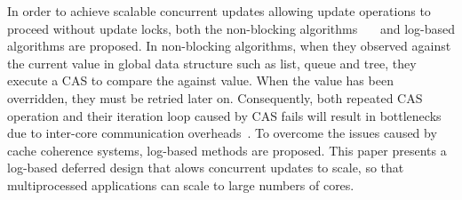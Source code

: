 In order to achieve scalable concurrent updates allowing update operations to
proceed without update locks, both the non-blocking
algorithms~\cite{Harris2001Lockfree}~\cite{Fomitchev2004Lockfree}~\cite{Timnat2012}
and log-based algorithms are proposed.
In non-blocking algorithms, when they observed against the current value in
global data structure such as list, queue and tree, they execute a CAS to
compare the against value.
When the value has been overridden, they must be retried later on.
Consequently, both repeated CAS operation and their iteration loop caused
by CAS fails will result in bottlenecks due to inter-core communication
overheads~\cite{SilasBoydWickizerPth}.
To overcome the issues caused by cache coherence systems, log-based methods are
proposed.
This paper presents a log-based deferred design that alows concurrent updates to
scale, so that multiprocessed applications can scale to large numbers of cores.
\fi












